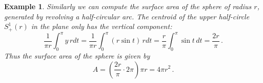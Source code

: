\documentclass[12pt]{article}
\newtheorem{ex}{Example}
\begin{document}
\begin{ex}
Similarly we can compute the surface area of the sphere of radius $r$,
generated by revolving a half-circular arc.
The centroid of the upper half-circle $S^1_+(r)$ in the plane only has
the vertical component:
\[
\frac{1}{\pi r} \int_0^\pi y \, r dt = \frac{1}{\pi r} \int_0^\pi (r \sin t) \, r dt = \frac{r}{\pi} \int_0^\pi \sin t \, dt = \frac{2r}{\pi}\,.
\]
Thus the surface area of the sphere is given by
\[
A = \left( \frac{2r}{\pi} \cdot 2\pi  \right) \pi r = 4\pi r^2\,.
\]
\end{ex}
\end{document}
